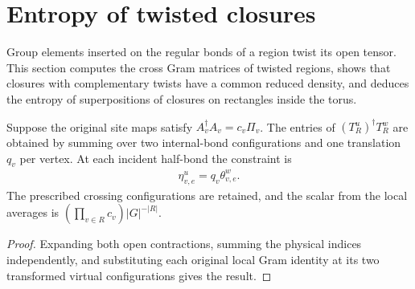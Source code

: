 \section{Entropy of twisted closures}%
\label{sec:peps_twisted_closure_entropy}

Group elements inserted on the regular bonds of a region twist its open
tensor. This section computes the cross Gram matrices of twisted regions,
shows that closures with complementary twists have a common reduced density,
and deduces the entropy of superpositions of closures on rectangles inside the
torus.

\begin{lemma}%
    \label{thm:peps_regular_twisted_gram_expansion}
    \leanok
    Suppose the original site maps satisfy $A_v^\dagger A_v=c_v\Pi_v$.
    The entries of $(T_R^u)^\dagger T_R^w$ are obtained by summing over
    two internal-bond configurations and one translation $q_v$ per vertex.
    At each incident half-bond the constraint is
    \begin{align}
        \eta^u_{v,e}=q_v\theta^w_{v,e}.
    \end{align}
    The prescribed crossing configurations are retained, and the scalar
    from the local averages is $(\prod_{v\in R}c_v)|G|^{-|R|}$.
\end{lemma}

\begin{proof}\leanok
    Expanding both open contractions, summing the physical indices
    independently, and substituting each original local Gram identity at its
    two transformed virtual configurations gives the result.
\end{proof}

